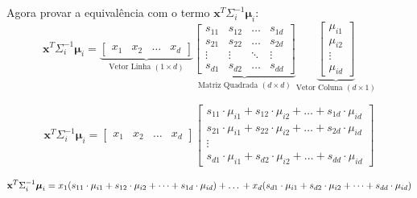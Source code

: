 \documentclass[12pt, a4paper]{article}
\begin{document}
Agora provar a equivalência com o termo $\mathbf{x}^T \Sigma_i^{-1} \boldsymbol{\mu}_i$:
\begin{equation*}
    \mathbf{x}^T \Sigma_i^{-1} \boldsymbol{\mu}_i  = 
    \underbrace{\begin{bmatrix}  
    x_1 & x_2 & \dots & x_d
    \end{bmatrix}}_{\text{Vetor Linha } (1 \times d)}
    \underbrace{\begin{bmatrix} s_{11} & s_{12} & \dots & s_{1d} \\ s_{21} & s_{22} & \dots & s_{2d} \\ \vdots & \vdots & \ddots & \vdots \\ s_{d1} & s_{d2} & \dots & s_{dd} \end{bmatrix}}_{\text{Matriz Quadrada } (d \times d)}
    \underbrace{\begin{bmatrix} 
    \mu_{i1} \\ \mu_{i2} \\ \vdots \\ \mu_{id}
     \end{bmatrix}}_{\text{Vetor Coluna } (d \times 1)}
\end{equation*}

\begin{equation*}
    \mathbf{x}^T \Sigma_i^{-1} \boldsymbol{\mu}_i  = 
    \begin{bmatrix} 
    x_1 & x_2 & \dots & x_d 
    \end{bmatrix}
    \begin{bmatrix}
    s_{11} \cdot \mu_{i1} + s_{12} \cdot \mu_{i2} + \dots + s_{1d} \cdot \mu_{id} \\
    s_{21} \cdot \mu_{i1} + s_{22} \cdot \mu_{i2} + \dots + s_{2d} \cdot \mu_{id} \\ 
    \vdots \\
    s_{d1} \cdot \mu_{i1} + s_{d2} \cdot \mu_{i2} + \dots + s_{dd} \cdot \mu_{id}
    \end{bmatrix}
\end{equation*}

\begin{equation*}
    \mathbf{x}^T \Sigma_i^{-1} \boldsymbol{\mu}_i  = 
    x_1(s_{11} \cdot \mu_{i1} + s_{12} \cdot \mu_{i2} + \dots + s_{1d} \cdot \mu_{id} )\\
    + \ldots \\
    + x_d(s_{d1} \cdot \mu_{i1} + s_{d2} \cdot \mu_{i2} + \dots + s_{dd} \cdot \mu_{id})
\end{equation*}
\end{document}
